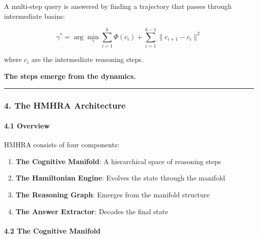 \documentclass[
  11pt,
  a4paper,
]{article}
\providecommand{\tightlist}{%
  \setlength{\itemsep}{0pt}\setlength{\parskip}{0pt}}
\begin{document}
A multi-step query is answered by finding a trajectory that passes
through intermediate basins:

\[
\gamma^* = \arg\min_{\gamma} \sum_{i=1}^{k} \Phi(c_i) + \sum_{i=1}^{k-1} \|c_{i+1} - c_i\|^2
\]

where \(c_i\) are the intermediate reasoning steps.

\textbf{The steps emerge from the dynamics.}

\begin{center}\rule{0.5\linewidth}{0.5pt}\end{center}

\subsubsection{4. The HMHRA Architecture}\label{the-hmhra-architecture}

\paragraph{4.1 Overview}\label{overview-3}

HMHRA consists of four components:

\begin{enumerate}
\def\labelenumi{\arabic{enumi}.}
\tightlist
\item
  \textbf{The Cognitive Manifold}: A hierarchical space of reasoning
  steps
\item
  \textbf{The Hamiltonian Engine}: Evolves the state through the
  manifold
\item
  \textbf{The Reasoning Graph}: Emerges from the manifold structure
\item
  \textbf{The Answer Extractor}: Decodes the final state
\end{enumerate}

\paragraph{4.2 The Cognitive Manifold}\label{the-cognitive-manifold}
\end{document}
